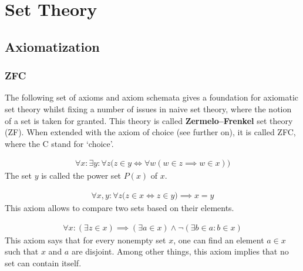 \chapter{Set Theory}

\section{Axiomatization}\label{section:axiomatization}
\subsection{ZFC}

    The following set of axioms and axiom schemata gives a foundation for axiomatic set theory whilst fixing a number of issues in naive set theory, where the notion of a set is taken for granted. This theory is called \textbf{Zermelo--Frenkel} set theory (ZF). When extended with the axiom of choice (see further on), it is called ZFC, where the C stand for `choice'.

    \begin{axiom}\label{set:power_set_axiom}
        \begin{gather}
            \forall x:\exists y:\forall z\bigl(z\in y\iff\forall w(w\in z\implies w\in x)\bigr)
        \end{gather}
        The set $y$ is called the power set $P(x)$ of $x$.
    \end{axiom}

    \begin{axiom}[Extensionality]
        \begin{gather}
            \forall x,y:\forall z\bigl(z\in x\iff z\in y\bigr)\implies x=y
        \end{gather}
        This axiom allows to compare two sets based on their elements.
    \end{axiom}

    \begin{axiom}
        \begin{gather}
            \forall x:(\exists z\in x)\implies(\exists a\in x)\land\neg(\exists b\in a:b\in x)
        \end{gather}
        This axiom says that for every nonempty set $x$, one can find an element $a\in x$ such that $x$ and $a$ are disjoint. Among other things, this axiom implies that no set can contain itself.
    \end{axiom}

